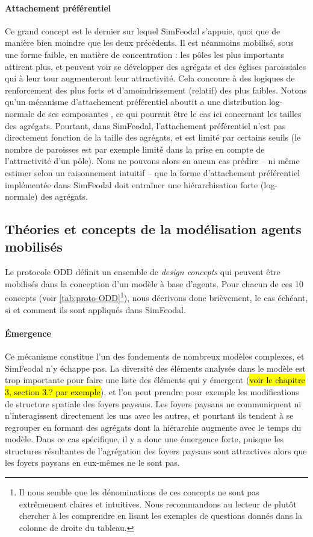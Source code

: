 \paragraph{Attachement préférentiel} Ce \og grand concept\fg{} est le dernier sur lequel SimFeodal s'appuie, quoi que de manière bien moindre que les deux précédents.
Il est néanmoins mobilisé, sous une forme faible, en matière de concentration : les pôles les plus importants attirent plus, et peuvent voir se développer des agrégats et des églises paroissiales qui à leur tour augmenteront leur attractivité.
Cela concoure à des logiques de renforcement des plus forts et d'amoindrissement (relatif) des plus faibles.
Notons qu'un mécanisme d'attachement préférentiel aboutit a une distribution log-normale de ses composantes \autocite{barabasi_emergence_1999}, ce qui pourrait être le cas ici concernant les tailles des agrégats.
Pourtant, dans SimFeodal, l'attachement préférentiel n'est pas directement fonction de la taille des agrégats, et est limité par certains seuils (le nombre de paroisses est par exemple limité dans la prise en compte de l'attractivité d'un pôle).
Nous ne pouvons alors en aucun cas prédire -- ni même estimer selon un raisonnement intuitif -- que la forme d'attachement préférentiel implémentée dans SimFeodal doit entraîner une hiérarchisation forte (log-normale) des agrégats. 

\subsection{Théories et concepts de la modélisation agents mobilisés}

Le protocole ODD définit un ensemble de \textit{design concepts} qui peuvent être mobilisés dans la conception d'un modèle à base d'agents.
Pour chacun de ces 10 concepts (voir \cref{tab:proto-ODD}\footnote{
Il nous semble que les dénominations de ces concepts ne sont pas extrêmement claires et intuitives.
Nous recommandons au lecteur de plutôt chercher à les comprendre en lisant les exemples de questions donnés dans la colonne de droite du tableau.
}), nous décrivons donc brièvement, le cas échéant, si et comment ils sont appliqués dans SimFeodal.

\paragraph{Émergence} Ce mécanisme constitue l'un des fondements de nombreux modèles complexes, et SimFeodal n'y échappe pas.
La diversité des éléments analysés dans le modèle est trop importante pour faire une liste des éléments qui y émergent (\hl{voir le chapitre 3, section 3.? par exemple}), et l'on peut prendre pour exemple les modifications de structure spatiale des foyers paysans.
Les foyers paysans ne communiquent ni n'interagissent directement les uns avec les autres, et pourtant ils tendent à se regrouper en formant des agrégats dont la hiérarchie augmente avec le temps du modèle.
Dans ce cas spécifique, il y a donc une émergence \og forte\fg{}, puisque les structures résultantes de l'agrégation des foyers paysans sont attractives alors que les foyers paysans en eux-mêmes ne le sont pas.

